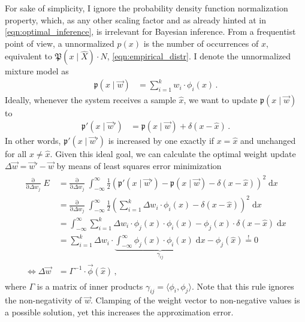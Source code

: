 \documentclass[a4paper,11pt]{article}
\begin{document}
For sake of simplicity, I ignore the probability density function normalization property, which, as any other scaling factor and as already hinted at in \cref{eqn:optimal_inference}, is irrelevant for Bayesian inference. From a frequentist point of view, a unnormalized $p(x)$ is the number of occurrences of $x$, equivalent to $\mathfrak{P}(x \mid \hat X) \cdot N$, \cref{eqn:empirical_distr}. I denote the unnormalized mixture model as
\begin{align}
	\mathfrak{p}(x \mid \vec w) &= \sum_{i=1}^k w_i \cdot \phi_i(x)\,.
	\label{eqn:mixture_denorm}
\end{align}
Ideally, whenever the system receives a sample $\hat x$, we want to update $\mathfrak{p}(x \mid \vec w)$ to
\begin{align}
	\mathfrak{p'}(x \mid \vec w') &= \mathfrak{p}(x \mid \vec w) + \delta(x - \hat x)\,.
\end{align}
In other words, $\mathfrak{p'}(x \mid \vec w')$ is increased by one exactly if $x = \hat x$ and unchanged for all $x \neq \hat x$. Given this ideal goal, we can calculate the optimal weight update $\Delta \vec w = \vec w' - \vec w$ by means of least squares error minimization
\begin{align}
	\begin{aligned}
	\frac{\mathrm{\partial}}{\mathrm{\partial}\Delta w_j} \; E &=
	\frac{\mathrm{\partial}}{\mathrm{\partial}\Delta w_j} \; \int_{-\infty}^\infty \frac{1}2
		\left(
			\mathfrak{p'}(x \mid \vec w') - \mathfrak{p}(x \mid \vec w) - \delta(x - \hat x) 
		\right)^2 \;\mathrm{d}x \\
	&= \frac{\mathrm{\partial}}{\mathrm{\partial}\Delta w_j} \; \int_{-\infty}^\infty \frac{1}2
		\left(
			\sum_{i=1}^k \Delta w_i \cdot \phi_i(x) - \delta(x - \hat x) 
		\right)^2 \;\mathrm{d}x \\
	&= \int_{-\infty}^\infty
			\sum_{i=1}^k \Delta w_i \cdot \phi_j(x) \cdot \phi_i(x) - \phi_j(x) \cdot \delta(x - \hat x) 
		\;\mathrm{d}x \\
	&= \sum_{i=1}^k \Delta w_i \cdot \underbrace{\int_{-\infty}^\infty \phi_j(x) \cdot \phi_i(x) \;\mathrm{d}x}_{\gamma_{ij}} - \phi_j(\hat x) \overset{!} = 0 \\
	\Leftrightarrow \Delta \vec w
	&= \Gamma^{-1} \cdot \vec \phi(\hat x) \,,
	\end{aligned}
	\label{eqn:update_rule}
\end{align}
where $\Gamma$ is a matrix of inner products $\gamma_{ij} = \langle \phi_i, \phi_j \rangle$. Note that this rule ignores the non-negativity of $\vec w$. Clamping of the weight vector to non-negative values is a possible solution, yet this increases the approximation error.
\end{document}
